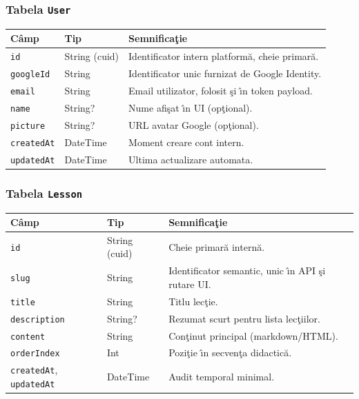 \documentclass[12pt,onecolumn,draftclsnofoot]{IEEEtran}
\begin{document}
\subsubsection{Tabela \texttt{User}}
\begin{longtable}{p{} p{} p{}}
\toprule
\textbf{C\^{a}mp} & \textbf{Tip} & \textbf{Semnifica\c{t}ie} \\
\midrule
\texttt{id} & String (cuid) & Identificator intern platform\u{a}, cheie primar\u{a}. \\
\texttt{googleId} & String & Identificator unic furnizat de Google Identity. \\
\texttt{email} & String & Email utilizator, folosit \c{s}i \^{\i}n token payload. \\
\texttt{name} & String? & Nume afi\c{s}at \^{\i}n UI (op\c{t}ional). \\
\texttt{picture} & String? & URL avatar Google (op\c{t}ional). \\
\texttt{createdAt} & DateTime & Moment creare cont intern. \\
\texttt{updatedAt} & DateTime & Ultima actualizare automata. \\
\bottomrule
\end{longtable}

\subsubsection{Tabela \texttt{Lesson}}
\begin{longtable}{p{} p{} p{}}
\toprule
\textbf{C\^{a}mp} & \textbf{Tip} & \textbf{Semnifica\c{t}ie} \\
\midrule
\texttt{id} & String (cuid) & Cheie primar\u{a} intern\u{a}. \\
\texttt{slug} & String & Identificator semantic, unic \^{\i}n API \c{s}i rutare UI. \\
\texttt{title} & String & Titlu lec\c{t}ie. \\
\texttt{description} & String? & Rezumat scurt pentru lista lec\c{t}iilor. \\
\texttt{content} & String & Con\c{t}inut principal (markdown/HTML). \\
\texttt{orderIndex} & Int & Pozi\c{t}ie \^{\i}n secven\c{t}a didactic\u{a}. \\
\texttt{createdAt}, \texttt{updatedAt} & DateTime & Audit temporal minimal. \\
\bottomrule
\end{longtable}
\end{document}
